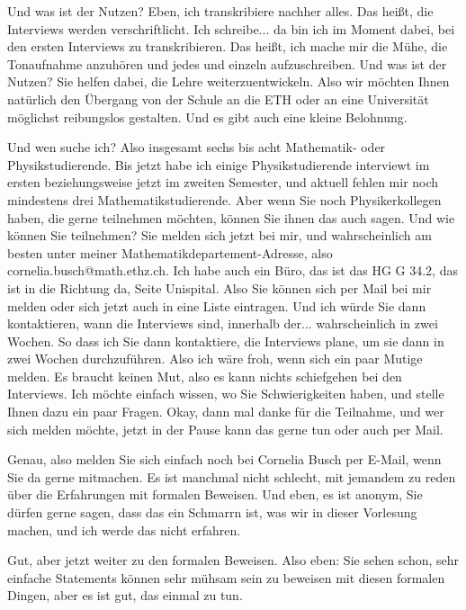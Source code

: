\begin{spoken-clean}[00:41:30 - 00:46:53]
Und was ist der Nutzen? Eben, ich transkribiere nachher alles. Das heißt, die Interviews werden verschriftlicht. Ich schreibe... da bin ich im Moment dabei, bei den ersten Interviews zu transkribieren. Das heißt, ich mache mir die Mühe, die Tonaufnahme anzuhören und jedes  und  einzeln aufzuschreiben. Und was ist der Nutzen? Sie helfen dabei, die Lehre weiterzuentwickeln. Also wir möchten Ihnen natürlich den Übergang von der Schule an die ETH oder an eine Universität möglichst reibungslos gestalten. Und es gibt auch eine kleine Belohnung.

Und wen suche ich? Also insgesamt sechs bis acht Mathematik- oder Physikstudierende. Bis jetzt habe ich einige Physikstudierende interviewt im ersten beziehungsweise jetzt im zweiten Semester, und aktuell fehlen mir noch mindestens drei Mathematikstudierende. Aber wenn Sie noch Physikerkollegen haben, die gerne teilnehmen möchten, können Sie ihnen das auch sagen. Und wie können Sie teilnehmen? Sie melden sich jetzt bei mir, und wahrscheinlich am besten unter meiner Mathematikdepartement-Adresse, also cornelia.busch@math.ethz.ch. Ich habe auch ein Büro, das ist das HG G 34.2, das ist in die Richtung da, Seite Unispital. Also Sie können sich per Mail bei mir melden oder sich jetzt auch in eine Liste eintragen. Und ich würde Sie dann kontaktieren, wann die Interviews sind, innerhalb der... wahrscheinlich in zwei Wochen. So dass ich Sie dann kontaktiere, die Interviews plane, um sie dann in zwei Wochen durchzuführen. Also ich wäre froh, wenn sich ein paar Mutige melden. Es braucht keinen Mut, also es kann nichts schiefgehen bei den Interviews. Ich möchte einfach wissen, wo Sie Schwierigkeiten haben, und stelle Ihnen dazu ein paar Fragen. Okay, dann mal danke für die Teilnahme, und wer sich melden möchte, jetzt in der Pause kann das gerne tun oder auch per Mail.

\end{spoken-clean}

\begin{spoken-clean}[00:46:54 - 00:47:38]
Genau, also melden Sie sich einfach noch bei Cornelia Busch per E-Mail, wenn Sie da gerne mitmachen. Es ist manchmal nicht schlecht, mit jemandem zu reden über die Erfahrungen mit formalen Beweisen. Und eben, es ist anonym, Sie dürfen gerne sagen, dass das ein Schmarrn ist, was wir in dieser Vorlesung machen, und ich werde das nicht erfahren.

Gut, aber jetzt weiter zu den formalen Beweisen. Also eben: Sie sehen schon, sehr einfache Statements können sehr mühsam sein zu beweisen mit diesen formalen Dingen, aber es ist gut, das einmal zu tun.
\end{spoken-clean}

